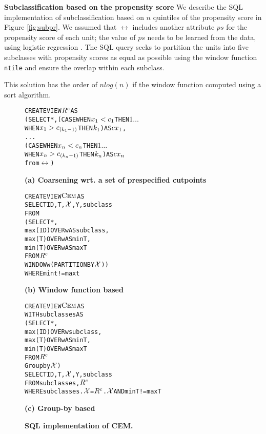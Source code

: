 {\bf Subclassification based on the propensity score} We describe the
SQL implementation of subclassification based on $n$ quintiles of the
propensity score in Figure \ref{fig:subpr}.  We assumed that $\rel$
includes another attribute $ps$ for the propensity score of each unit;
the value of $ps$ needs to be learned from the data, using logistic
regression \cite{Rubin1983b}.  The SQL query seeks to partition
the units into five subclasses with propensity scores as equal as
possible using the window function {\verb|ntile|} and ensure the overlap within each subclass.  This solution has the order of $nlog(n)$ if the window
function computed using a sort algorithm.







\begin{figure}
\begin{alltt} 
CREATE VIEW \(\crele\) AS
(SELECT *, (CASE WHEN \(x\sb{1}<c\sb{1}\)  THEN \(1 \ldots\)
                 WHEN \(x\sb{1}>c\sb{(k\sb{1}-1)}\) THEN \(k\sb{1}\)) AS \(cx\sb{1}\),
              . . .
           (CASE WHEN \(x\sb{n}<c\sb{n}\)  THEN \(1 \ldots\)
                 WHEN \(x\sb{n}>c\sb{(k\sb{n}-1)}\) THEN \(k\sb{n}\)) AS \(cx\sb{n}\)
from \(\rel\))
\end{alltt} \vspace{-.2cm} \hspace{1.7cm}
{\bf{(a) Coarsening wrt. a set of prespecified cutpoints}}
\vspace{-.3cm}
\begin{alltt} 
CREATE VIEW \(\cem\) AS
SELECT ID, T, \(\ccv\), Y, subclass
FROM
  (SELECT *,
          max(ID) OVER w AS subclass, 
          max(T) OVER w AS minT,
          min(T) OVER w AS maxT
   FROM \(\crele\)
   WINDOW w (PARTITION BY \(\ccv\)))
WHERE mint!=maxt
\end{alltt}\vspace{-.2cm} \hspace{3cm}
\bf{(b) Window function based}
\vspace{-.3cm}
\begin{alltt} 
CREATE VIEW \(\cem\) AS
WITH subclasses AS
  (SELECT *,
          max(ID) OVER w subclass, 
          max(T) OVER w AS minT,
          min(T) OVER w AS maxT
   FROM \(\crele\)
   Group by \(\ccv\))
SELECT ID, T, \(\ccv\), Y, subclass
FROM subclasses,\(\crele\)
WHERE subclasses.\(\ccv\)=\(\crele\).\(\ccv\)  AND  minT!=maxT

\end{alltt}\vspace{-.2cm}\hspace{3.5cm}
 \bf{(c) Group-by based}
\vspace{-.1cm}
  \caption{\bf{SQL implementation of CEM.}}\label{fig:cem}
\end{figure}


